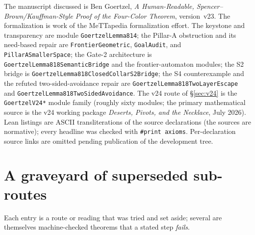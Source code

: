 \documentclass[11pt]{article}
\theoremstyle{definition}
\begin{document}
The manuscript discussed is Ben Goertzel, \emph{A Human-Readable,
Spencer--Brown/Kauffman-Style Proof of the Four-Color Theorem}, version~v23. The
formalization is work of the MeTTapedia formalization effort. The keystone and
transparency are module \texttt{GoertzelLemma814}; the Pillar-A obstruction and
its need-based repair are \texttt{FrontierGeometric}, \texttt{GoalAudit}, and
\texttt{PillarASmallerSpace}; the Gate-2 architecture is
\texttt{GoertzelLemma818SemanticBridge} and the frontier-automaton modules; the
S2 bridge is \texttt{GoertzelLemma818ClosedCollarS2Bridge}; the S4 counterexample
and the refuted two-sided-avoidance repair are
\texttt{GoertzelLemma818TwoLayerEscape} and
\texttt{GoertzelLemma818TwoSidedAvoidance}. The v24 route of \S\ref{sec:v24}
is the \texttt{GoertzelV24*} module family (roughly sixty modules; the primary
mathematical source is the v24 working package \emph{Deserts, Pivots, and the
Necklace}, July 2026). Lean listings are ASCII
transliterations of the source declarations (the sources are normative); every
headline was checked with \texttt{\#print axioms}. Per-declaration source links
are omitted pending publication of the development tree.

\section{A graveyard of superseded sub-routes}
\label{app:graveyard}

Each entry is a route or reading that was tried and set aside; several are
themselves machine-checked theorems that a stated step \emph{fails}.
\end{document}
